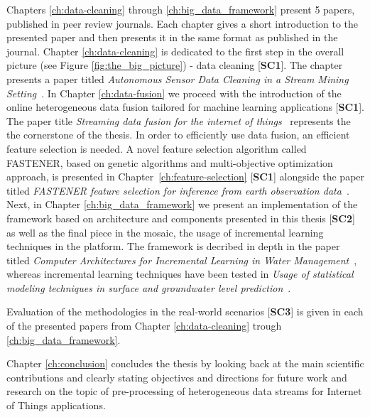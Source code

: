 Chapters \ref{ch:data-cleaning} through \ref{ch:big_data_framework} present 5 papers, published in peer review journals.
Each chapter gives a short introduction to the presented paper and then presents it in the same format as published in the journal.
Chapter \ref{ch:data-cleaning} is dedicated to the first step in the overall picture (see Figure \ref{fig:the_big_picture}) - data cleaning [\textbf{SC1}]. The chapter presents a paper titled \textit{Autonomous Sensor Data
Cleaning in a Stream Mining Setting}~\cite{kenda:2018:autonomous}.
In Chapter \ref{ch:data-fusion} we proceed with the introduction of the online heterogeneous data fusion tailored for machine learning applications [\textbf{SC1}].
The paper title \textit{Streaming data fusion for the internet of things}~\cite{kenda:2019:fusion} represents the the cornerstone of the thesis.
In order to efficiently use data fusion, an efficient feature selection is needed.
A novel feature selection algorithm called FASTENER, based on genetic algorithms and multi-objective optimization approach, is presented in Chapter~\ref{ch:feature-selection} [\textbf{SC1}] alongside the paper titled \textit{FASTENER feature selection for inference from earth observation data}~\cite{koprivec:2020:fastener}.
Next, in Chapter \ref{ch:big_data_framework} we present an implementation of the framework based on architecture and components presented in this thesis [\textbf{SC2}] as well as the final piece in the mosaic, the usage of incremental learning techniques in the platform.
The framework is decribed in depth in the paper titled \textit{Computer Architectures for Incremental Learning in Water Management}~\cite{kenda:2022:water-framework}, whereas incremental learning techniques have been tested in \textit{Usage of statistical modeling techniques in surface and groundwater level prediction}~\cite{kenda:2020:water-modeling}.

Evaluation of the methodologies in the real-world scenarios [\textbf{SC3}] is given in each of the presented papers from Chapter \ref{ch:data-cleaning} trough \ref{ch:big_data_framework}.

Chapter \ref{ch:conclusion} concludes the thesis by looking back at the main scientific contributions and clearly stating objectives and directions for future work and research on the topic of pre-processing of heterogeneous data streams for Internet of Things applications.
